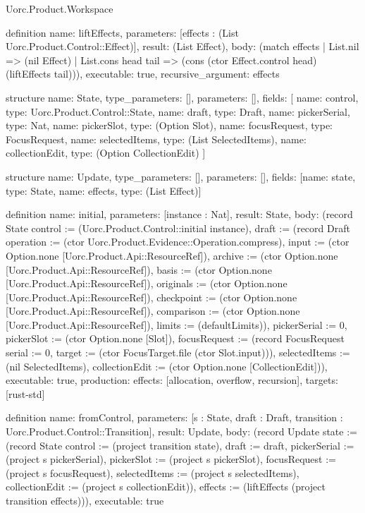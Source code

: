 \begin{lexlean}{Uorc.Product.Workspace}
\begin{semanticmodule}
definition{
  name: liftEffects,
  parameters: [effects : (List Uorc.Product.Control::Effect)],
  result: (List Effect),
  body: (match effects
    | List.nil => (nil Effect)
    | List.cons head tail => (cons (ctor Effect.control head) (liftEffects tail))),
  executable: true,
  recursive_argument: effects
}

structure{
  name: State,
  type_parameters: [],
  parameters: [],
  fields: [
    {name: control, type: Uorc.Product.Control::State},
    {name: draft, type: Draft},
    {name: pickerSerial, type: Nat},
    {name: pickerSlot, type: (Option Slot)},
    {name: focusRequest, type: FocusRequest},
    {name: selectedItems, type: (List SelectedItems)},
    {name: collectionEdit, type: (Option CollectionEdit)}
  ]
}

structure{
  name: Update,
  type_parameters: [],
  parameters: [],
  fields: [{name: state, type: State}, {name: effects, type: (List Effect)}]
}

definition{
  name: initial,
  parameters: [instance : Nat],
  result: State,
  body: (record State {control := (Uorc.Product.Control::initial instance), draft := (record Draft {operation := (ctor Uorc.Product.Evidence::Operation.compress), input := (ctor Option.none [Uorc.Product.Api::ResourceRef]), archive := (ctor Option.none [Uorc.Product.Api::ResourceRef]), basis := (ctor Option.none [Uorc.Product.Api::ResourceRef]), originals := (ctor Option.none [Uorc.Product.Api::ResourceRef]), checkpoint := (ctor Option.none [Uorc.Product.Api::ResourceRef]), comparison := (ctor Option.none [Uorc.Product.Api::ResourceRef]), limits := (defaultLimits)}), pickerSerial := 0, pickerSlot := (ctor Option.none [Slot]), focusRequest := (record FocusRequest {serial := 0, target := (ctor FocusTarget.file (ctor Slot.input))}), selectedItems := (nil SelectedItems), collectionEdit := (ctor Option.none [CollectionEdit])}),
  executable: true,
  production: {effects: [allocation, overflow, recursion], targets: [rust-std]}
}

definition{
  name: fromControl,
  parameters: [s : State, draft : Draft, transition : Uorc.Product.Control::Transition],
  result: Update,
  body: (record Update {state := (record State {control := (project transition state), draft := draft, pickerSerial := (project s pickerSerial), pickerSlot := (project s pickerSlot), focusRequest := (project s focusRequest), selectedItems := (project s selectedItems), collectionEdit := (project s collectionEdit)}), effects := (liftEffects (project transition effects))}),
  executable: true
}


\end{semanticmodule}
\end{lexlean}
